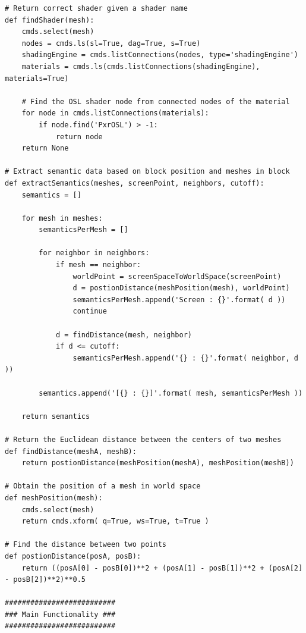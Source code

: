 \documentclass[conference]{IEEEtran}
\begin{document}
{{\begin{verbatim}
# Return correct shader given a shader name
def findShader(mesh):
    cmds.select(mesh)
    nodes = cmds.ls(sl=True, dag=True, s=True)
    shadingEngine = cmds.listConnections(nodes, type='shadingEngine')
    materials = cmds.ls(cmds.listConnections(shadingEngine), materials=True)
    
    # Find the OSL shader node from connected nodes of the material
    for node in cmds.listConnections(materials):
        if node.find('PxrOSL') > -1:
            return node
    return None

# Extract semantic data based on block position and meshes in block
def extractSemantics(meshes, screenPoint, neighbors, cutoff):
    semantics = []
    
    for mesh in meshes:
        semanticsPerMesh = []
        
        for neighbor in neighbors:
            if mesh == neighbor:
                worldPoint = screenSpaceToWorldSpace(screenPoint)
                d = postionDistance(meshPosition(mesh), worldPoint)
                semanticsPerMesh.append('Screen : {}'.format( d ))
                continue
                
            d = findDistance(mesh, neighbor)
            if d <= cutoff:
                semanticsPerMesh.append('{} : {}'.format( neighbor, d ))
        
        semantics.append('[{} : {}]'.format( mesh, semanticsPerMesh ))
                
    return semantics

# Return the Euclidean distance between the centers of two meshes
def findDistance(meshA, meshB):
    return postionDistance(meshPosition(meshA), meshPosition(meshB))

# Obtain the position of a mesh in world space
def meshPosition(mesh):
    cmds.select(mesh)
    return cmds.xform( q=True, ws=True, t=True )

# Find the distance between two points
def postionDistance(posA, posB):
    return ((posA[0] - posB[0])**2 + (posA[1] - posB[1])**2 + (posA[2] - posB[2])**2)**0.5

##########################
### Main Functionality ###
##########################


\end{verbatim}}}
\end{document}
